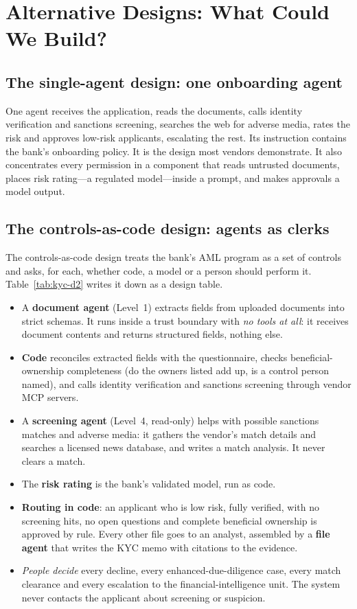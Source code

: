 \section{Alternative Designs: What Could We Build?}
\label{sec:kyc-designs}

\subsection{The single-agent design: one onboarding agent}

One agent receives the application, reads the documents, calls identity verification and sanctions screening, searches the web for adverse media, rates the risk and approves low-risk applicants, escalating the rest. Its instruction contains the bank's onboarding policy. It is the design most vendors demonstrate. It also concentrates every permission in a component that reads untrusted documents, places risk rating---a regulated model---inside a prompt, and makes approvals a model output.

\subsection{The controls-as-code design: agents as clerks}

The controls-as-code design treats the bank's AML program as a set of controls and asks, for each, whether code, a model or a person should perform it. Table~\ref{tab:kyc-d2} writes it down as a design table.
\begin{itemize}[itemsep=1pt]
  \item A \textbf{document agent} (Level~1) extracts fields from uploaded documents into strict schemas. It runs inside a trust boundary with \emph{no tools at all}: it receives document contents and returns structured fields, nothing else.
  \item \textbf{Code} reconciles extracted fields with the questionnaire, checks beneficial-ownership completeness (do the owners listed add up, is a control person named), and calls identity verification and sanctions screening through vendor MCP servers.
  \item A \textbf{screening agent} (Level~4, read-only) helps with possible sanctions matches and adverse media: it gathers the vendor's match details and searches a licensed news database, and writes a match analysis. It never clears a match.
  \item The \textbf{risk rating} is the bank's validated model, run as code.
  \item \textbf{Routing in code}: an applicant who is low risk, fully verified, with no screening hits, no open questions and complete beneficial ownership is approved by rule. Every other file goes to an analyst, assembled by a \textbf{file agent} that writes the KYC memo with citations to the evidence.
  \item \emph{People decide} every decline, every enhanced-due-diligence case, every match clearance and every escalation to the financial-intelligence unit. The system never contacts the applicant about screening or suspicion.
\end{itemize}

